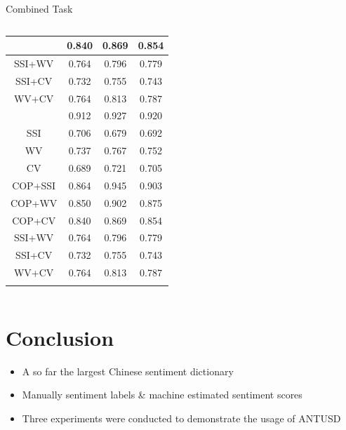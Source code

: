\documentclass[compress]{beamer}
\begin{document}
\begin{frame}{Combined Task}
\begin{columns}
\begin{column}[T]{.6\textwidth}
\begin{table}
\begin{tabular}{cccc}
{                        COP+CV     & 0.840     & 0.869  & 0.854   \\ \hline
                        SSI+WV     & 0.764     & 0.796  & 0.779   \\ \hline
                        SSI+CV     & 0.732     & 0.755  & 0.743   \\ \hline
                        WV+CV      & 0.764     & 0.813  & 0.787   \\ \hline
                    }
                    \only<3>{
                        COP        & 0.912     & 0.927  & 0.920   \\ \hline
                        SSI        & 0.706     & 0.679  & 0.692   \\ \hline
                        WV         & 0.737     & 0.767  & \cellcolor{green}0.752   \\ \hline
                        CV         & 0.689     & 0.721  & \cellcolor{green}0.705   \\ \hline
                        COP+SSI    & 0.864     & 0.945  & 0.903   \\ \hline
                        COP+WV     & 0.850     & 0.902  & 0.875   \\ \hline
                        COP+CV     & 0.840     & 0.869  & 0.854   \\ \hline
                        SSI+WV     & 0.764     & 0.796  & 0.779   \\ \hline
                        SSI+CV     & 0.732     & 0.755  & 0.743   \\ \hline
                        WV+CV      & 0.764     & 0.813  & \cellcolor{red}0.787   \\ \hline
                    }
                    \end{tabular}
                    \end{table}
                \end{column}
            \end{columns}
        \end{frame}

\section{Conclusion}
    \begin{frame}{\secname}
        \begin{itemize}
            \item A so far the largest Chinese sentiment dictionary
            \item Manually sentiment labels \& machine estimated sentiment scores 
            \item Three experiments were conducted to demonstrate the usage of ANTUSD
        \end{itemize}
    \end{frame}
\end{document}
